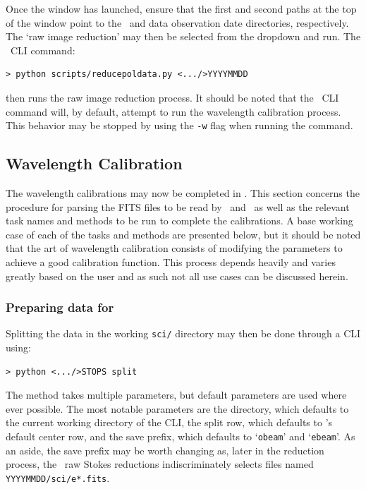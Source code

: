 \noindent Once the window has launched, ensure that the first and second paths at the top of the window point to the \polsalt\ and data observation date directories, respectively. The `raw image reduction' may then be selected from the dropdown and run. The \polsalt\ \gls{CLI} command:

\begin{verbatim}> python scripts/reducepoldata.py <.../>YYYYMMDD\end{verbatim}

\noindent then runs the raw image reduction process. It should be noted that the \polsalt\ \gls{CLI} command will, by default, attempt to run the wavelength calibration process. This behavior may be stopped by using the \texttt{-w} flag when running the command.


\subsection{Wavelength Calibration} \label{subsec:reduc_wav}

The wavelength calibrations may now be completed in \iraf. This section concerns the procedure for parsing the \gls{FITS} files to be read by \iraf\ and \polsalt\ as well as the relevant task names and methods to be run to complete the calibrations. A base working case of each of the tasks and methods are presented below, but it should be noted that the art of wavelength calibration consists of modifying the parameters to achieve a good calibration function. This process depends heavily and varies greatly based on the user and as such not all use cases can be discussed herein.

\subsubsection{Preparing data for \iraf}

Splitting the data in the working \texttt{sci/} directory may then be done through a \gls{CLI} using:

\begin{verbatim}> python <.../>STOPS split\end{verbatim}

The method takes multiple parameters, but default parameters are used where ever possible. The most notable parameters are the directory, which defaults to the current working directory of the \gls{CLI}, the split row, which defaults to \polsalt's default center row, and the save prefix, which defaults to `\texttt{obeam}' and `\texttt{ebeam}'. As an aside, the save prefix may be worth changing as, later in the reduction process, the \polsalt\ raw Stokes reductions indiscriminately selects files named \texttt{YYYYMMDD/sci/e*.fits}.


